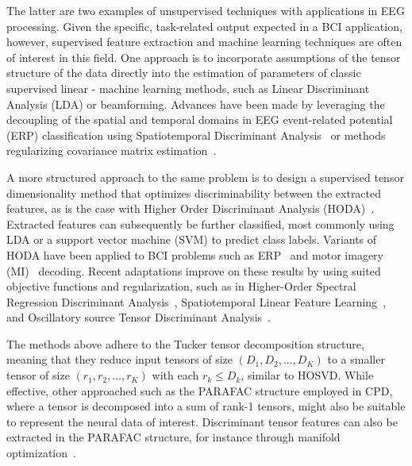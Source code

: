\documentclass[twocolumn]{article}
\begin{document}
The latter are two examples of unsupervised techniques with applications in EEG
processing.
Given the specific, task-related output expected in a BCI application, however,
supervised feature extraction and machine learning techniques are often of
interest in this field.
One approach is to incorporate assumptions of the tensor structure of the data
directly into the estimation of parameters of classic supervised linear -
machine learning methods, such as Linear Discriminant Analysis (LDA) or beamforming.
Advances have been made by leveraging the decoupling of the spatial and temporal
domains in EEG event-related potential (ERP) classification using Spatiotemporal
Discriminant Analysis~\cite{Li2010,Zhang2013} or methods regularizing covariance
matrix estimation~\cite{Kerchove2022,Sosulski2022}.

A more structured approach to the same problem is to design a supervised
tensor dimensionality method that optimizes discriminability between the
extracted features, as is the case with Higher Order Discriminant
Analysis (\textsc{HODA})~\cite{Yan2005,Phan2010,Froelich2018}.
Extracted features can subsequently be further classified, most commonly
using LDA or a support vector machine (SVM) to predict class labels.
Variants of \textsc{HODA} have been applied to BCI problems such as
ERP~\cite{Onishi2012,Higashi2016} and motor imagery (MI)~\cite{Liu2015,Cai2021}
decoding.
Recent adaptations improve on these results by using suited objective
functions and regularization, such as in Higher-Order Spectral Regression
Discriminant Analysis~\cite{Jamshidi2017}, Spatiotemporal Linear
Feature Learning~\cite{Aghili2023}, and Oscillatory source Tensor Discriminant
Analysis~\cite{Jorajuria2022}.

The methods above adhere to the Tucker tensor decomposition
structure, meaning that they reduce input tensors of size
$(D_1,D_2,\ldots,D_K)$ to a smaller tensor of size $(r_1,r_2,\ldots,r_K)$ with
each $r_k\leq D_k$, similar to \textsc{HOSVD}.
While effective, other approached such as the \textsc{PARAFAC} structure employed in
\textsc{CPD}, where a tensor is decomposed into a sum of rank-1 tensors,
might also be suitable to represent the neural data of interest.
Discriminant tensor features can also be extracted
in the \textsc{PARAFAC} structure, for instance through manifold
optimization~\cite{Froelich2018}.
\end{document}
